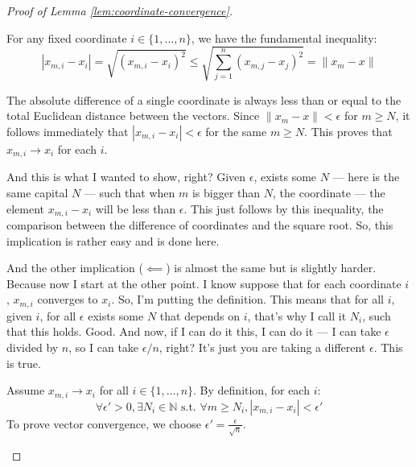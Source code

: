 \begin{proof}[Proof of Lemma \ref{lem:coordinate-convergence}]
\begin{math-stroke}
For any fixed coordinate $i \in \{1, \dots, n\}$, we have the fundamental inequality:
\begin{equation}\label{eq:coord-norm-bound}
|x_{m,i} - x_i| = \sqrt{(x_{m,i} - x_i)^2} \le \sqrt{\sum_{j=1}^n (x_{m,j} - x_j)^2} = \|x_m - x\|
\end{equation}
\begin{explanation-of-steps}
The absolute difference of a single coordinate is always less than or equal to the total Euclidean distance between the vectors. Since $\|x_m - x\| < \epsilon$ for $m \ge N$, it follows immediately that $|x_{m,i} - x_i| < \epsilon$ for the same $m \ge N$. This proves that $x_{m,i} \to x_i$ for each $i$.
\end{explanation-of-steps}
\end{math-stroke}

\begin{spoken-clean}[00:20:12 - 00:21:30]
And this is what I wanted to show, right? Given $\epsilon$, exists some $N$ --- here is the same capital $N$ --- such that when $m$ is bigger than $N$, the coordinate --- the element $x_{m,i} - x_i$ will be less than $\epsilon$. This just follows by this inequality, the comparison between the difference of coordinates and the square root. So, this implication is rather easy and is done here. 
\end{spoken-clean}

\begin{spoken-clean}[00:21:30 - 00:22:55]
And the other implication ($\impliedby$) is almost the same but is slightly harder. Because now I start at the other point. I know suppose that for each coordinate $i$, $x_{m,i}$ converges to $x_i$. So, I'm putting the definition.  This means that for all $i$, given $i$, for all $\epsilon$ exists some $N$ that depends on $i$, that's why I call it $N_i$, such that this holds. Good. And now, if I can do it this, I can do it --- I can take $\epsilon$ divided by $n$, so I can take $\epsilon/n$, right? It's just you are taking a different $\epsilon$. This is true.
\end{spoken-clean}

\begin{math-stroke}[Proof: Implication \texorpdfstring{$\impliedby$}{<=}]
Assume $x_{m,i} \to x_i$ for all $i \in \{1, \dots, n\}$.
By definition, for each $i$:
\[ \forall \epsilon' > 0, \exists N_i \in \mathbb{N} \text{ s.t. } \forall m \ge N_i, |x_{m,i} - x_i| < \epsilon' \]
To prove vector convergence, we choose $\epsilon' = \frac{\epsilon}{\sqrt{n}}$.
\end{math-stroke}


\end{proof}
